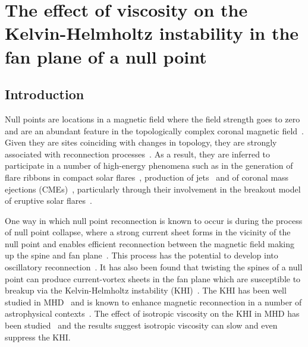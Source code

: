 \chapter{The effect of viscosity on the Kelvin-Helmholtz instability in the fan plane of a null point}
\label{chp:null_point_khi}

\graphicspath{{images/null_point_khi/}}

\section{Introduction}

Null points are locations in a magnetic field where the field strength goes to zero and are an abundant feature in the topologically complex coronal magnetic field~\cite{edwardsNullPointDistribution2015}. Given they are sites coinciding with changes in topology, they are strongly associated with reconnection processes~\cite{yangImagingSpectralStudy2020,sunHOTSPINELOOPS2013}. As a result, they are inferred to participate in a number of high-energy phenomena such as in the generation of flare ribbons in compact solar flares~\cite{massonNATUREFLARERIBBONS2009,pontinWhyAreFlare2016a}, production of jets~\cite{moreno-insertisPLASMAJETSERUPTIONS2013} and of coronal mass ejections (CMEs)~\cite{barnesRelationshipCoronalMagnetic2007,zouContinuousNullPointMagnetic2020}, particularly through their involvement in the breakout model of eruptive solar flares~\cite{macleanTopologicalAnalysisMagnetic2005}.

One way in which null point reconnection is known to occur is during the process of null point collapse, where a strong current sheet forms in the vicinity of the null point and enables efficient reconnection between the magnetic field making up the spine and fan plane~\cite{thurgoodImplosiveCollapseMagnetic2018}. This process has the potential to develop into oscillatory reconnection~\cite{thurgoodThreedimensionalOscillatoryMagnetic2017}. It has also been found that twisting the spines of a null point can produce current-vortex sheets in the fan plane which are susceptible to breakup via the Kelvin-Helmholtz instability (KHI)~\cite{wyperKelvinHelmholtzInstabilityCurrentvortex2013}. The KHI has been well studied in MHD~\cite{chandrasekharHydrodynamicHydromagneticStability1981,einaudiResistiveInstabilitiesFlowing1986} and is known to enhance magnetic reconnection in a number of astrophysical contexts~\cite{minEffectsMagneticReconnection1997,kowalKelvinHelmholtzTearingInstability2020}. The effect of isotropic viscosity on the KHI in MHD has been studied~\cite{howsonEffectsResistivityViscosity2017,roedigerViscousKelvinHelmholtzInstabilities2013a,wyperKelvinHelmholtzInstabilityCurrentvortex2013} and the results suggest isotropic viscosity can slow and even suppress the KHI.

